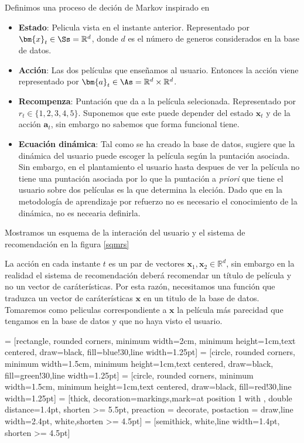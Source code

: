 Definimos una proceso de deción de Markov inspirado en \cite{shani2005mdp}
\begin{itemize}
    \item \textbf{Estado}: Pelicula vista en el instante anterior. Representado por $\bm{x}_{t} \in \Ss = \mathbb{R}^d$, donde $d$ es el número de generos considerados en la base de datos. 
    \item \textbf{Acción}: Las dos películas que enseñamos al usuario. Entonces la acción viene representado por  $\bm{a}_t \in \As = \mathbb{R}^d \times \mathbb{R}^d$. 
    \item \textbf{Recompenza}: Puntación que da a la película selecionada. Representado por $r_t \in \{1,2,3,4,5\}$. Suponemos que este puede depender del estado $\bm{x}_t$ y de la acción $\bm{a}_t$, sin embargo no sabemos que forma funcional tiene.
    \item \textbf{Ecuación dinámica}: Tal como se ha creado la base de datos, sugiere que la dinámica del usuario puede escoger la película según la puntación asociada. Sin embargo, en el plantamiento el usuario hasta despues de ver la película no tiene una puntación asociada por lo que la puntación a \emph{priori} que tiene el usuario sobre dos películas es la que determina la eleción. Dado que en la metodología de aprendizaje por refuerzo no es necesario el conocimiento de la dinámica, no es necearia definirla.
\end{itemize}

Mostramos un esquema de la interación del usuario y el sistema de recomendación en la figura \ref{sqmrs}

\begin{obs}
    La acción en cada instante $t$ es un par de vectores $\bm{x}_1,\bm{x}_2 \in \mathbb{R}^d$, sin embargo en la realidad el sistema de recomendación deberá recomendar un título de película y no un vector de caráterísticas. Por esta razón, necesitamos una función que traduzca un vector de caráterísticas $\bm{x}$ en un titulo de la base de datos. Tomaremos como peliculas correspondiente a $\bm{x}$ la película más parecidad que tengamos en la base de datos y que no haya visto el usuario.
\end{obs}




 = [rectangle, rounded corners, minimum width=2cm, minimum height=1cm,text centered, draw=black, fill=blue!30,line width=1.25pt]
 = [circle, rounded corners, minimum width=1.5cm, minimum height=1cm,text centered, draw=black, fill=green!30,line width=1.25pt]
 = [circle, rounded corners, minimum width=1.5cm, minimum height=1cm,text centered, draw=black, fill=red!30,line width=1.25pt]
 = [thick, decoration={markings,mark=at position
   1 with {}},
   double distance=1.4pt, shorten >= 5.5pt,
   preaction = {decorate},
   postaction = {draw,line width=2.4pt, white,shorten >= 4.5pt}]
 = [semithick, white,line width=1.4pt, shorten >= 4.5pt]

